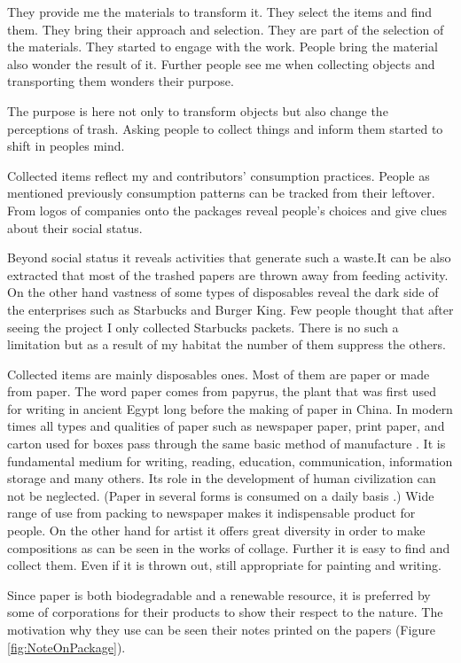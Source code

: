 They provide me the materials to transform it. They select the items and find them. They bring their approach and selection. They are part of the selection of the materials. They started to engage with the work. People bring the material also wonder the result of it. Further people see me when collecting objects and transporting them wonders their purpose. 

The purpose is here not only to transform objects but also change the perceptions of trash. Asking people to collect things and inform them started to shift in peoples mind.

Collected items reflect my and contributors' consumption practices. People as mentioned previously consumption patterns can be tracked from their leftover. From logos of companies onto the packages reveal people's choices and give clues about their social status.

Beyond social status it reveals activities that generate such a waste.It can be also extracted that most of the trashed papers are thrown away from feeding activity. On the other hand vastness of some types of disposables reveal the dark side of the enterprises such as Starbucks and Burger King. Few people thought that after seeing the project I only collected Starbucks packets. There is no such a limitation but as a result of my habitat the number of them suppress the others.

Collected items are mainly disposables ones. Most of them are paper or made from paper. The word paper comes from papyrus, the plant that was first used for writing in ancient Egypt long before the making of paper in China. In modern times all types and qualities of paper such as newspaper paper, print paper, and carton used for boxes pass through the same basic method of manufacture \citep{trafford2012paper}. It is fundamental medium for writing, reading, education, communication, information storage and many others. Its role in the development of human civilization can not be neglected. (Paper in several forms is consumed on a daily basis \citep{trafford2012paper}.) Wide range of use from packing to newspaper makes it indispensable product for people. On the other hand for artist it offers great diversity in order to make compositions as can be seen in the works of collage. Further it is easy to find and collect them. Even if it is thrown out, still appropriate for painting and writing.

Since paper is both biodegradable and a renewable resource, it is preferred by some of corporations for their products to show their respect to the nature. The motivation why they use can be seen their notes printed on the papers (Figure \ref{fig:NoteOnPackage}).

